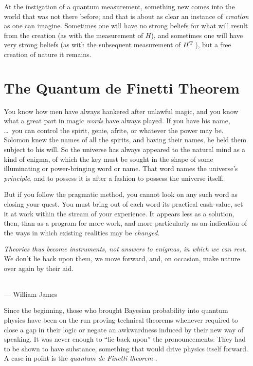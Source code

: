 \documentclass[aps,pra,superscriptaddress,10pt,tightenlines,twocolumn,nofootinbib]{revtex4}
\begin{document}
At the instigation of a quantum measurement, something new comes into the world that was not there before; and that is about as clear an instance of {\it creation\/} as one can imagine.  Sometimes one will have no strong beliefs for what will result from the creation (as with the measurement of $H$), and sometimes one will have very strong beliefs (as with the subsequent measurement of $H^{\rm T}\,$), but a free creation of nature it remains.

\vfill

\section{The Quantum de Finetti Theorem}

\begin{flushright}
\baselineskip=13pt
\parbox{2.8in}{\baselineskip=13pt\footnotesize

You know how men have always hankered after unlawful magic, and you know
what a great part in magic {\it words\/} have always played. If you
have his name, \ldots\ you can
control the spirit, genie, afrite, or whatever the power may be.
Solomon knew the names of all the spirits, and having their names, he
held them subject to his will.  So the universe has always appeared
to the natural mind as a kind of enigma, of which the key must be
sought in the shape of some illuminating or power-bringing word or
name.  That word names the universe's {\it principle}, and to possess
it is after a fashion to possess the universe itself.\medskip

But if you follow the pragmatic method, you cannot look on any such
word as closing your quest.  You must bring out of each word its
practical cash-value, set it at work within the stream of your
experience.  It appears less as a solution, then, than as a program
for more work, and more particularly as an indication of the ways in
which existing realities may be {\it changed}.\medskip

{\it Theories thus become instruments, not answers to enigmas, in
which we can rest.}  We don't lie back upon them, we move forward,
and, on occasion, make nature over again by their aid.}
\medskip\\
 --- William James
\end{flushright}

Since the beginning, those who brought Bayesian probability into quantum physics have been on the run proving technical theorems whenever required to close a gap in their logic or negate an awkwardness induced by their new way of speaking.  It was never enough to ``lie back upon'' the pronouncements:  They had to be shown to have substance, something that would drive physics itself forward.  A case in point is the {\it quantum de Finetti theorem} \cite{Fuchs04,Caves02b}.
\end{document}
